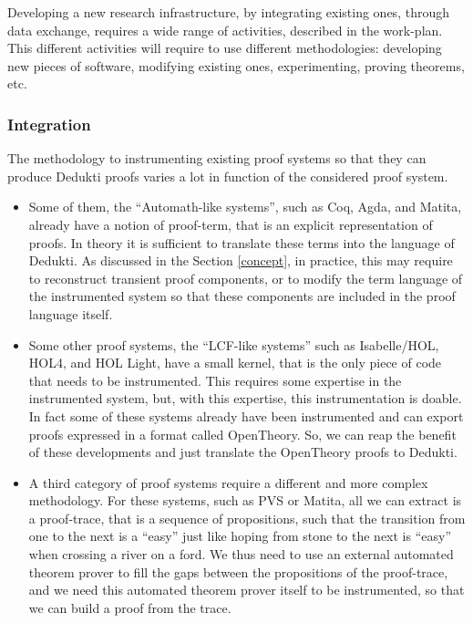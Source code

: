 Developing a new research infrastructure, by integrating existing
ones, through data exchange, requires a wide range of activities,
described in the work-plan. This different activities will require to
use different methodologies: developing new pieces of software,
modifying existing ones, experimenting, proving theorems, etc.

\subsubsection*{Integration}

The methodology to instrumenting existing proof systems so that they
can produce Dedukti proofs varies a lot in function of the considered
proof system.

\begin{itemize}

\item 
Some of them, the ``Automath-like systems'', such as Coq, Agda, and
Matita, already have a notion of proof-term, that is an explicit
representation of proofs.  In theory it is sufficient to translate
these terms into the language of Dedukti.  As discussed in the Section
\ref{concept}, in practice, this may require to reconstruct transient
proof components, or to modify the term language of the instrumented
system so that these components are included in the proof language
itself.

\item
Some other proof systems, the ``LCF-like systems'' such as
Isabelle/HOL, HOL4, and HOL Light, have a small kernel, that is the
only piece of code that needs to be instrumented. This requires some
expertise in the instrumented system, but, with this expertise, this
instrumentation is doable. In fact some of these systems already have
been instrumented and can export proofs expressed in a format called
OpenTheory. So, we can reap the benefit of these developments and just
translate the OpenTheory proofs to Dedukti.

\item
A third category of proof systems require a different and more complex
methodology. For these systems, such as PVS or Matita, all we can
extract is a proof-trace, that is a sequence of propositions, such
that the transition from one to the next is a ``easy'' just like
hoping from stone to the next is ``easy'' when crossing a river on a
ford. We thus need to use an external automated theorem prover to fill
the gaps between the propositions of the proof-trace, and we need this
automated theorem prover itself to be instrumented, so that we can
build a proof from the trace.
\end{itemize}

